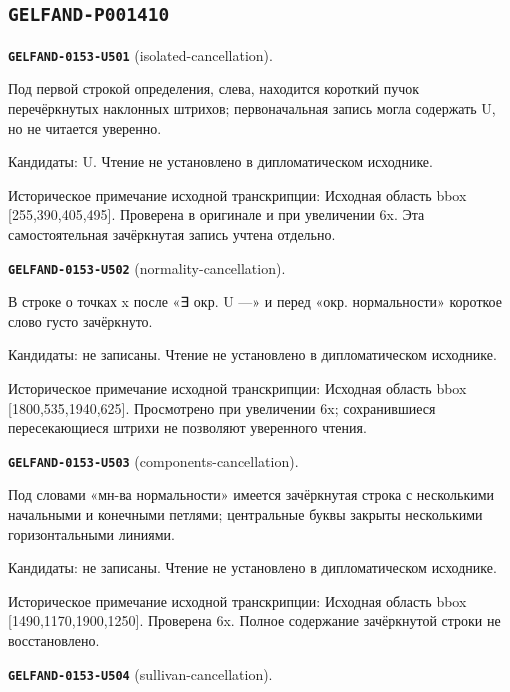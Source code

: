 \subsection*{\texttt{GELFAND-P001410}}
\par\noindent\leavevmode{}\label{GELFAND-0153-U501}\textbf{\texttt{GELFAND-0153-U501}} (isolated-cancellation).\nopagebreak[4]\par
Под первой строкой определения, слева, находится короткий пучок перечёркнутых наклонных штрихов; первоначальная запись могла содержать U, но не читается уверенно.\par
Кандидаты: U. Чтение не установлено в дипломатическом исходнике.\par
Историческое примечание исходной транскрипции: Исходная область bbox [255,390,405,495]. Проверена в оригинале и при увеличении 6x. Эта самостоятельная зачёркнутая запись учтена отдельно.\par\medskip
\par\noindent\leavevmode{}\label{GELFAND-0153-U502}\textbf{\texttt{GELFAND-0153-U502}} (normality-cancellation).\nopagebreak[4]\par
В строке о точках x после «∃ окр. U —» и перед «окр. нормальности» короткое слово густо зачёркнуто.\par
Кандидаты: не записаны. Чтение не установлено в дипломатическом исходнике.\par
Историческое примечание исходной транскрипции: Исходная область bbox [1800,535,1940,625]. Просмотрено при увеличении 6x; сохранившиеся пересекающиеся штрихи не позволяют уверенного чтения.\par\medskip
\par\noindent\leavevmode{}\label{GELFAND-0153-U503}\textbf{\texttt{GELFAND-0153-U503}} (components-cancellation).\nopagebreak[4]\par
Под словами «мн-ва нормальности» имеется зачёркнутая строка с несколькими начальными и конечными петлями; центральные буквы закрыты несколькими горизонтальными линиями.\par
Кандидаты: не записаны. Чтение не установлено в дипломатическом исходнике.\par
Историческое примечание исходной транскрипции: Исходная область bbox [1490,1170,1900,1250]. Проверена 6x. Полное содержание зачёркнутой строки не восстановлено.\par\medskip
\par\noindent\leavevmode{}\label{GELFAND-0153-U504}\textbf{\texttt{GELFAND-0153-U504}} (sullivan-cancellation).\nopagebreak[4]\par
